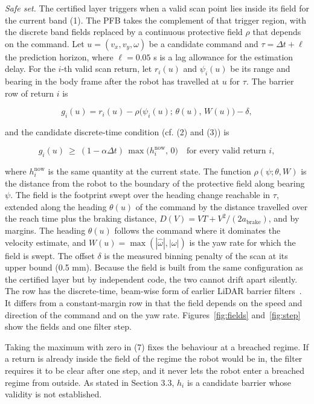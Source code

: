 \emph{Safe set.} The certified layer triggers when a valid scan point lies inside its field for the current band (1). The PFB takes the complement of that trigger region, with the discrete band fields replaced by a continuous protective field $\rho$ that depends on the command. Let $u = (v_x, v_y, \omega)$ be a candidate command and $\tau = \Delta t + \ell$ the prediction horizon, where $\ell = 0.05$ s is a lag allowance for the estimation delay. For the $i$-th valid scan return, let $r_i(u)$ and $\psi_i(u)$ be its range and bearing in the body frame after the robot has travelled at $u$ for $\tau$. The barrier row of return $i$ is

\begin{equation*}
g_i(u) = r_i(u) - \rho\big(\psi_i(u);\, \theta(u),\, W(u)\big) - \delta,
\tag{6}
\end{equation*}

and the candidate discrete-time condition (cf. (2) and (3)) is

\begin{equation*}
g_i(u) \ \ge\ (1 - \alpha \Delta t)\,\max\big(h_i^{\mathrm{now}},\, 0\big) \quad \text{for every valid return } i,
\tag{7}
\end{equation*}

where $h_i^{\mathrm{now}}$ is the same quantity at the current state. The function $\rho(\psi; \theta, W)$ is the distance from the robot to the boundary of the protective field along bearing $\psi$. The field is the footprint swept over the heading change reachable in $\tau$, extended along the heading $\theta(u)$ of the command by the distance travelled over the reach time plus the braking distance, $D(V) = V T + V^2 / (2 a_{\mathrm{brake}})$, and by margins. The heading $\theta(u)$ follows the command where it dominates the velocity estimate, and $W(u) = \max(|\hat\omega|, |\omega|)$ is the yaw rate for which the field is swept. The offset $\delta$ is the measured binning penalty of the scan at its upper bound (0.5 mm). Because the field is built from the same configuration as the certified layer but by independent code, the two cannot drift apart silently. The row has the discrete-time, beam-wise form of earlier LiDAR barrier filters~\cite{olayemi2026}. It differs from a constant-margin row in that the field depends on the speed and direction of the command and on the yaw rate. Figures~\ref{fig:fields} and~\ref{fig:step} show the fields and one filter step.

Taking the maximum with zero in (7) fixes the behaviour at a breached regime. If a return is already inside the field of the regime the robot would be in, the filter requires it to be clear after one step, and it never lets the robot enter a breached regime from outside. As stated in Section 3.3, $h_i$ is a candidate barrier whose validity is not established.

